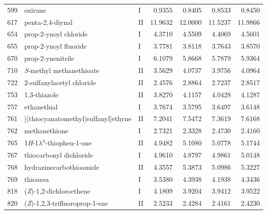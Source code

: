 \begin{longtable}{rlld{2.5}d{2.5}d{2.5}d{2.5}}
    599  & oxirane                                                & I  & 0.9355  & 0.8405  & 0.8533  & 0.8450  \\
    617  & penta-2,4-diynal                                       & II & 11.9632 & 12.0000 & 11.5237 & 11.9866 \\
    654  & prop-2-ynoyl chloride                                  & I  & 4.3710  & 4.5509  & 4.4069  & 4.5601  \\
    655  & prop-2-ynoyl fluoride                                  & I  & 3.7781  & 3.8118  & 3.7643  & 3.8570  \\
    670  & prop-2-ynenitrile                                      & I  & 6.1079  & 5.8668  & 5.7879  & 5.9364  \\
    710  & \textit{S}-methyl methanethioate                       & II & 3.5629  & 4.0737  & 3.9756  & 4.0964  \\
    722  & 2-sulfanylacetyl chloride                              & II & 2.4576  & 2.8864  & 2.7237  & 2.8517  \\
    753  & 1,3-thiazole                                           & II & 3.8270  & 4.1157  & 4.0428  & 4.1287  \\
    757  & ethanethial                                            & I  & 3.7674  & 3.5795  & 3.6497  & 3.6148  \\
    761  & [(thiocyanatomethyl)sulfanyl]ethyne                    & II & 7.2041  & 7.5472  & 7.3619  & 7.6168  \\
    762  & methanethione                                          & I  & 2.7321  & 2.3328  & 2.4730  & 2.4160  \\
    765  & 1\textit{H}-1$\lambda^4$-thiophen-1-one                & II & 4.9482  & 5.1080  & 5.0778  & 5.1744  \\
    767  & thiocarbonyl dichloride                                & I  & 4.9610  & 4.8797  & 4.9861  & 5.0148  \\
    768  & hydrazinecarbothioamide                                & II & 4.3557  & 5.3873  & 5.0986  & 5.3227  \\
    769  & thiourea                                               & I  & 3.5380  & 4.3938  & 4.1938  & 4.3436  \\
    818  & (\textit{Z})-1,2-dichloroethene                        & I  & 4.1809  & 3.9204  & 3.9412  & 3.9522  \\
    820  & (\textit{Z})-1,2,3-trifluoroprop-1-ene                 & II & 2.5233  & 2.4284  & 2.4161  & 2.4230  \\

\end{longtable}
